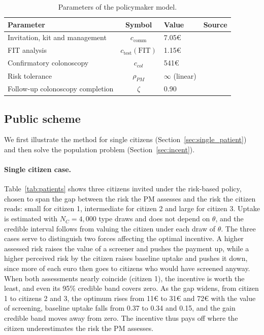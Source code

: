 \documentclass[12pt]{article}
\begin{document}
\begin{table}[h!]
\centering
\footnotesize
\caption{Parameters of the policymaker model.}
\label{tab:pm_params}
\begin{tabular}{l c l l}
\toprule
\textbf{Parameter} & \textbf{Symbol} & \textbf{Value} & \textbf{Source} \\
\midrule
Invitation, kit and management & $c_{\text{comm}}$ & 7.05€ & \citealp{arrospide2018cost} \\
FIT analysis & $c_{\text{test}}(\text{FIT})$ & 1.15€ & \citealp{arrospide2018cost} \\
Confirmatory colonoscopy & $c_{col}$ & 541€ & \citealp{arrospide2018cost} \\
Risk tolerance & $\rho_{PM}$ & $\infty$ (linear) & \citealp{arrow1978uncertainty} \\
Follow-up colonoscopy completion & $\zeta$ & 0.90 & \citealp{redcribado2021} \\
\bottomrule
\end{tabular}

\vspace{2pt}

\end{table}


 

\subsection{Public scheme}\label{sec:public_scheme_results}
We first illustrate the method for single citizens (Section~\ref{sec:single_patient}) and then solve the population problem (Section~\ref{sec:incent}).

\paragraph{Single citizen case.} Table~\ref{tab:patients} shows three citizens invited under the risk-based policy, chosen to span the gap between the risk the PM assesses and the risk the citizen reads: small for citizen 1, intermediate for citizen 2 and large for citizen 3. Uptake is estimated with $N_C = 4{,}000$ type draws and does not depend on $\theta$, and the credible interval follows from valuing the citizen under each draw of $\theta$.
The three cases serve to distinguish two forces affecting the optimal incentive. A higher assessed risk raises the value of a screener and pushes the payment up, while a higher perceived risk by the citizen raises baseline uptake and pushes it down, since more of each euro then goes to citizens who would have screened anyway. When both assessments nearly coincide (citizen 1), the incentive is worth the least, and even its 95\% credible band covers zero. As the gap widens, from citizen 1 to citizens 2 and 3, the optimum rises from 11€ to 31€ and 72€ with the value of screening, baseline uptake falls from 0.37 to 0.34 and 0.15, and the gain credible band moves away from zero. The incentive thus pays off where the citizen underestimates the risk the PM assesses.
\end{document}
